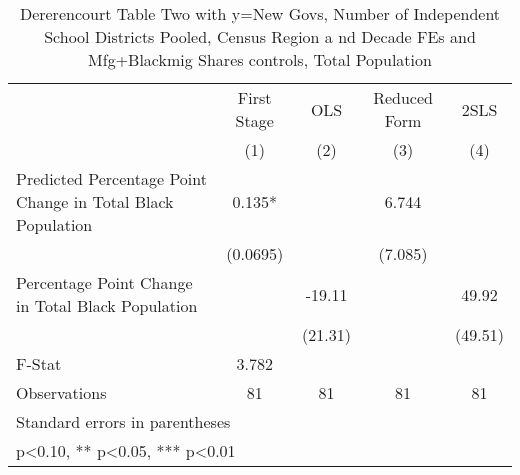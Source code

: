 \begin{table}[htbp]\centering
\def\sym#1{\ifmmode^{#1}\else\(^{#1}\)\fi}
\caption{Dererencourt Table Two with y=New Govs, Number of Independent School Districts  Pooled, Census Region a nd Decade FEs and Mfg+Blackmig Shares controls, Total Population}
\begin{tabular}{l*{4}{c}}
\toprule
                    & First Stage   &         OLS   &Reduced Form   &        2SLS   \\
                    &\multicolumn{1}{c}{(1)}   &\multicolumn{1}{c}{(2)}   &\multicolumn{1}{c}{(3)}   &\multicolumn{1}{c}{(4)}   \\
\midrule
Predicted Percentage Point Change in Total Black Population&       0.135*  &               &       6.744   &               \\
                    &    (0.0695)   &               &     (7.085)   &               \\
\addlinespace
Percentage Point Change in Total Black Population&               &      -19.11   &               &       49.92   \\
                    &               &     (21.31)   &               &     (49.51)   \\
\midrule
F-Stat              &       3.782   &               &               &               \\
Observations        &          81   &          81   &          81   &          81   \\
\bottomrule
\multicolumn{5}{l}{\footnotesize Standard errors in parentheses}\\
\multicolumn{5}{l}{\footnotesize * p<0.10, ** p<0.05, *** p<0.01}\\
\end{tabular}
\end{table}
